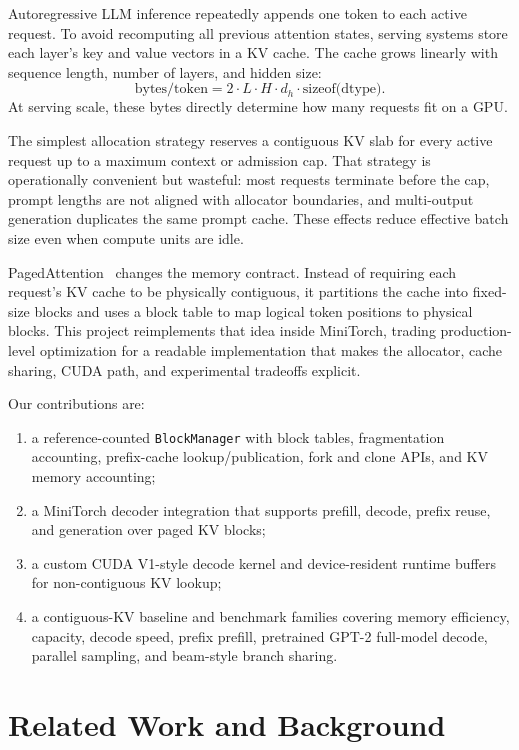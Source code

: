 \documentclass{article}
\begin{document}
Autoregressive LLM inference repeatedly appends one token to each active request.  To avoid recomputing all previous attention states, serving systems store each layer's key and value vectors in a KV cache.  The cache grows linearly with sequence length, number of layers, and hidden size:
\[
\text{bytes/token} = 2 \cdot L \cdot H \cdot d_h \cdot \text{sizeof(dtype)}.
\]
At serving scale, these bytes directly determine how many requests fit on a GPU.

The simplest allocation strategy reserves a contiguous KV slab for every active request up to a maximum context or admission cap.  That strategy is operationally convenient but wasteful: most requests terminate before the cap, prompt lengths are not aligned with allocator boundaries, and multi-output generation duplicates the same prompt cache.  These effects reduce effective batch size even when compute units are idle.

PagedAttention~\cite{kwon2023efficient} changes the memory contract.  Instead of requiring each request's KV cache to be physically contiguous, it partitions the cache into fixed-size blocks and uses a block table to map logical token positions to physical blocks.  This project reimplements that idea inside MiniTorch, trading production-level optimization for a readable implementation that makes the allocator, cache sharing, CUDA path, and experimental tradeoffs explicit.

Our contributions are:
\begin{enumerate}
    \item a reference-counted \texttt{BlockManager} with block tables, fragmentation accounting, prefix-cache lookup/publication, fork and clone APIs, and KV memory accounting;
    \item a MiniTorch decoder integration that supports prefill, decode, prefix reuse, and generation over paged KV blocks;
    \item a custom CUDA V1-style decode kernel and device-resident runtime buffers for non-contiguous KV lookup;
    \item a contiguous-KV baseline and benchmark families covering memory efficiency, capacity, decode speed, prefix prefill, pretrained GPT-2 full-model decode, parallel sampling, and beam-style branch sharing.
\end{enumerate}

\section{Related Work and Background}
\end{document}
